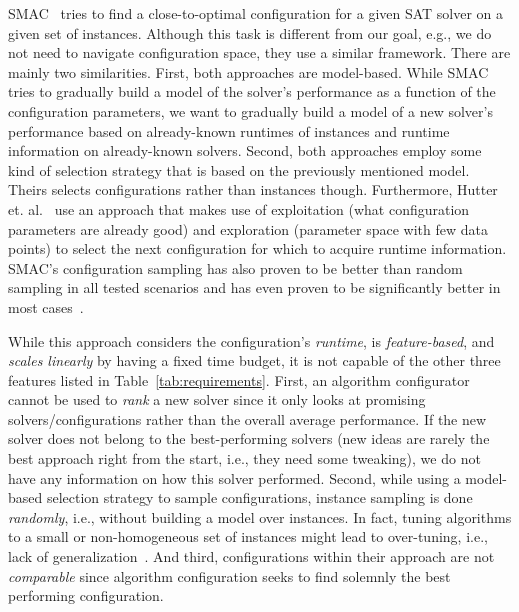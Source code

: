 \documentclass[runningheads]{llncs}
\begin{document}
SMAC~\cite{HutterHL11} tries to find a close-to-optimal configuration for a given SAT solver on a given set of instances.
Although this task is different from our goal, e.g., we do not need to navigate configuration space, they use a similar framework.
There are mainly two similarities.
First, both approaches are model-based.
While SMAC tries to gradually build a model of the solver's performance as a function of the configuration parameters, we want to gradually build a model of a new solver's performance based on already-known runtimes of instances and runtime information on already-known solvers.
Second, both approaches employ some kind of selection strategy that is based on the previously mentioned model.
Theirs selects configurations rather than instances though.
Furthermore, Hutter et. al.~\cite{HutterHL11} use an approach that makes use of exploitation (what configuration parameters are already good) and exploration (parameter space with few data points) to select the next configuration for which to acquire runtime information.
SMAC's configuration sampling has also proven to be better than random sampling in all tested scenarios and has even proven to be significantly better in most cases~\cite{HutterHL11}.

While this approach considers the configuration's \emph{runtime}, is \emph{feature-based}, and \emph{scales linearly} by having a fixed time budget, it is not capable of the other three features listed in Table~\ref{tab:requirements}.
First, an algorithm configurator cannot be used to \emph{rank} a new solver since it only looks at promising solvers/configurations rather than the overall average performance.
If the new solver does not belong to the best-performing solvers (new ideas are rarely the best approach right from the start, i.e., they need some tweaking), we do not have any information on how this solver performed.
Second, while using a model-based selection strategy to sample configurations, instance sampling is done \emph{randomly}, i.e., without building a model over instances.
In fact, tuning algorithms to a small or non-homogeneous set of instances might lead to over-tuning, i.e., lack of generalization~\cite{eggensperger2019pitfalls}.
And third, configurations within their approach are not \emph{comparable} since algorithm configuration seeks to find solemnly the best performing configuration.
\end{document}
